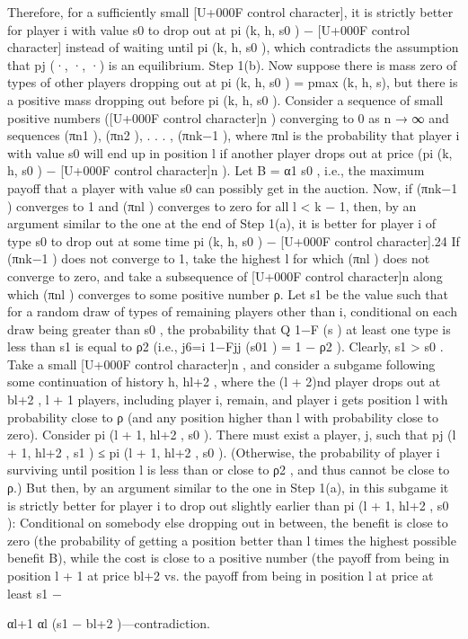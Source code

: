 \documentclass[10pt]{article}
\begin{document}
\begin{ReviewVerbatim}
Therefore, for a sufficiently small [U+000F control character], it is strictly better for player i with value s0 to drop out at
pi (k, h, s0 ) − [U+000F control character] instead of waiting until pi (k, h, s0 ), which contradicts the assumption that {pj (·, ·, ·)}
is an equilibrium.
Step 1(b). Now suppose there is mass zero of types of other players dropping out at pi (k, h, s0 ) =
pmax (k, h, s), but there is a positive mass dropping out before pi (k, h, s0 ). Consider a sequence of
small positive numbers ([U+000F control character]n ) converging to 0 as n → ∞ and sequences (πn1 ), (πn2 ), . . . , (πnk−1 ), where
πnl is the probability that player i with value s0 will end up in position l if another player drops
out at price (pi (k, h, s0 ) − [U+000F control character]n ). Let B = α1 s0 , i.e., the maximum payoff that a player with value s0
can possibly get in the auction. Now, if (πnk−1 ) converges to 1 and (πnl ) converges to zero for all
l < k − 1, then, by an argument similar to the one at the end of Step 1(a), it is better for player
i of type s0 to drop out at some time pi (k, h, s0 ) − [U+000F control character].24 If (πnk−1 ) does not converge to 1, take the
highest l for which (πnl ) does not converge to zero, and take a subsequence of [U+000F control character]n along which (πnl )
converges to some positive number ρ. Let s1 be the value such that for a random draw of types of
remaining players other than i, conditional on each draw being greater than s0 , the probability that
Q
1−F (s )
at least one type is less than s1 is equal to ρ2 (i.e., j6=i 1−Fjj (s01 ) = 1 − ρ2 ). Clearly, s1 > s0 . Take a
small [U+000F control character]n , and consider a subgame following some continuation of history h, hl+2 , where the (l + 2)nd
player drops out at bl+2 , l + 1 players, including player i, remain, and player i gets position l with
probability close to ρ (and any position higher than l with probability close to zero). Consider
pi (l + 1, hl+2 , s0 ). There must exist a player, j, such that pj (l + 1, hl+2 , s1 ) ≤ pi (l + 1, hl+2 , s0 ).
(Otherwise, the probability of player i surviving until position l is less than or close to ρ2 , and thus
cannot be close to ρ.) But then, by an argument similar to the one in Step 1(a), in this subgame
it is strictly better for player i to drop out slightly earlier than pi (l + 1, hl+2 , s0 ): Conditional on
somebody else dropping out in between, the benefit is close to zero (the probability of getting a
position better than l times the highest possible benefit B), while the cost is close to a positive
number (the payoff from being in position l + 1 at price bl+2 vs. the payoff from being in position
l at price at least s1 −

αl+1
αl (s1 − bl+2 )—contradiction.
\end{ReviewVerbatim}
\end{document}
